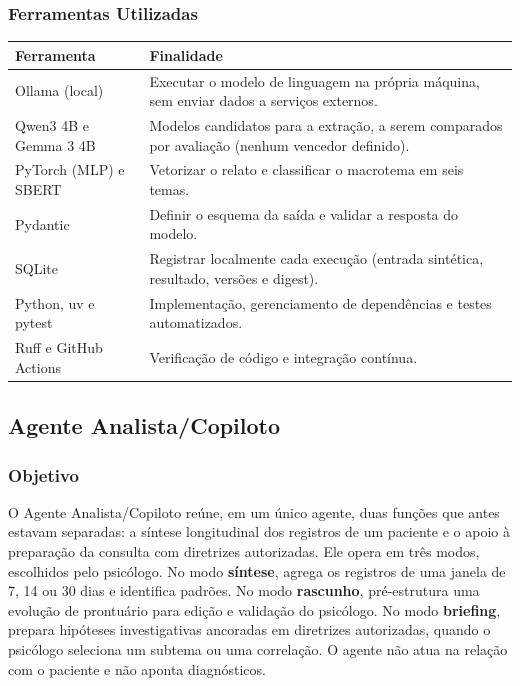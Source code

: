 \documentclass[12pt,a4paper]{article}
\newcommand{\cab}[1]{\textbf{#1}}
\begin{document}
\subsubsection{Ferramentas Utilizadas}
\begin{tabularx}{\textwidth}{|p{5cm}|Y|}
  \hline
  \cab{Ferramenta} & \cab{Finalidade} \\ \hline
  Ollama (local) & Executar o modelo de linguagem na própria máquina, sem enviar dados a serviços externos. \\ \hline
  Qwen3 4B e Gemma 3 4B & Modelos candidatos para a extração, a serem comparados por avaliação (nenhum vencedor definido). \\ \hline
  PyTorch (MLP) e SBERT & Vetorizar o relato e classificar o macrotema em seis temas. \\ \hline
  Pydantic & Definir o esquema da saída e validar a resposta do modelo. \\ \hline
  SQLite & Registrar localmente cada execução (entrada sintética, resultado, versões e digest). \\ \hline
  Python, uv e pytest & Implementação, gerenciamento de dependências e testes automatizados. \\ \hline
  Ruff e GitHub Actions & Verificação de código e integração contínua. \\ \hline
\end{tabularx}

\subsection{Agente Analista/Copiloto}

\subsubsection{Objetivo}
O Agente Analista/Copiloto reúne, em um único agente, duas funções que antes estavam separadas: a síntese longitudinal dos registros de um paciente e o apoio à preparação da consulta com diretrizes autorizadas. Ele opera em três modos, escolhidos pelo psicólogo. No modo \textbf{síntese}, agrega os registros de uma janela de 7, 14 ou 30 dias e identifica padrões. No modo \textbf{rascunho}, pré-estrutura uma evolução de prontuário para edição e validação do psicólogo. No modo \textbf{briefing}, prepara hipóteses investigativas ancoradas em diretrizes autorizadas, quando o psicólogo seleciona um subtema ou uma correlação. O agente não atua na relação com o paciente e não aponta diagnósticos.
\end{document}
